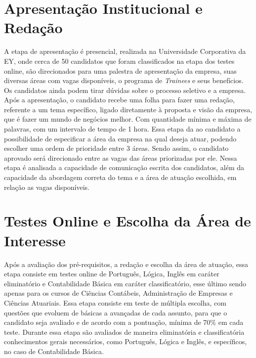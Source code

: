 \newpage


\section{Apresentação Institucional e Redação}

A etapa de apresentação é presencial, realizada na Universidade Corporativa da EY, onde cerca de 50 candidatos que foram classificados na etapa dos testes online, são direcionados para uma palestra de apresentação da empresa, suas diversas áreas com vagas disponíveis, o programa de \textit{Trainees} e seus benefícios. Os candidatos ainda podem tirar dúvidas sobre o processo seletivo e a empresa.
Após a apresentação, o candidato recebe uma folha para fazer uma redação, referente a um tema específico, ligado diretamente à proposta e visão da empresa, que é fazer um mundo de negócios melhor. Com quantidade mínima e máxima de palavras, com um intervalo de tempo de 1 hora. 
Essa etapa da ao candidato a possibilidade de especificar a área da empresa na qual deseja atuar, podendo escolher uma ordem de prioridade entre 3 áreas. Sendo assim, o candidato aprovado será direcionado entre as vagas das áreas priorizadas por ele.
Nessa etapa é analisada a capacidade de comunicação escrita dos candidatos, além da capacidade da abordagem correta do tema e a área de atuação escolhida, em relação as vagas disponíveis.




\section{Testes Online e Escolha da Área de Interesse}

Após a avaliação dos pré-requisitos, a redação e escolha da área de atuação, essa etapa consiste em testes online de Português, Lógica, Inglês em caráter eliminatório e Contabilidade Básica em caráter classificatório, esse último sendo apenas para os cursos de Ciências Contábeis, Administração de Empresas e Ciências Atuariais.
Essa etapa consiste em teste de múltipla escolha, com questões que evoluem de básicas a avançadas de cada assunto, para que o candidato seja avaliado e de acordo com a pontuação, mínima de 70\% em cada teste.
Durante essa etapa são avaliados de maneira eliminatória e classificatória conhecimentos gerais necessários, como Português, Lógica e Inglês, e específicos, no caso de Contabilidade Básica.



\newpage

